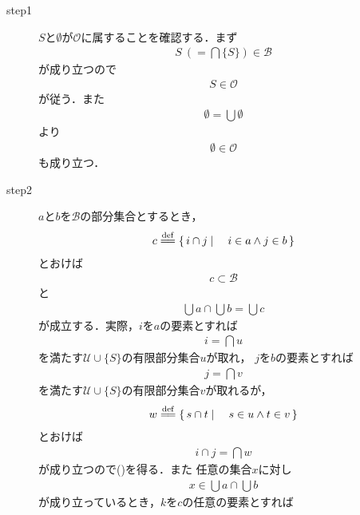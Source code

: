 	\begin{description}
		\item[step1]
			$S$と$\emptyset$が$\mathscr{O}$に属することを確認する．まず
			\begin{align}
				S\ (= \bigcap \{S\}) \in \mathscr{B}
			\end{align}
			が成り立つので
			\begin{align}
				S \in \mathscr{O}
			\end{align}
			が従う．また
			\begin{align}
				\emptyset = \bigcup \emptyset		
			\end{align}
			より
			\begin{align}
				\emptyset \in \mathscr{O}
			\end{align}
			も成り立つ．
		
		\item[step2]
			$a$と$b$を$\mathscr{B}$の部分集合とするとき，
			\begin{align}
				c \defeq \Set{i \cap j}{i \in a \wedge j \in b}
			\end{align}
			とおけば
			\begin{align}
				c \subset \mathscr{B}
				\label{fom:generation_of_topology_2}
			\end{align}
			と
			\begin{align}
				\bigcup a \cap \bigcup b = \bigcup c
				\label{fom:generation_of_topology_3}
			\end{align}
			が成立する．実際，$i$を$a$の要素とすれば
			\begin{align}
				i = \bigcap u
			\end{align}
			を満たす$\mathscr{U} \cup \{S\}$の有限部分集合$u$が取れ，
			$j$を$b$の要素とすれば
			\begin{align}
				j = \bigcap v
			\end{align}
			を満たす$\mathscr{U} \cup \{S\}$の有限部分集合$v$が取れるが，
			\begin{align}
				w \defeq \Set{s \cap t}{s \in u \wedge t \in v}
			\end{align}
			とおけば
			\begin{align}
				i \cap j = \bigcap w
			\end{align}
			が成り立つので()を得る．また
			任意の集合$x$に対し
			\begin{align}
				x \in \bigcup a \cap \bigcup b
			\end{align}
			が成り立っているとき，$k$を$c$の任意の要素とすれば
			\begin{align}

\end{align}
\end{description}
